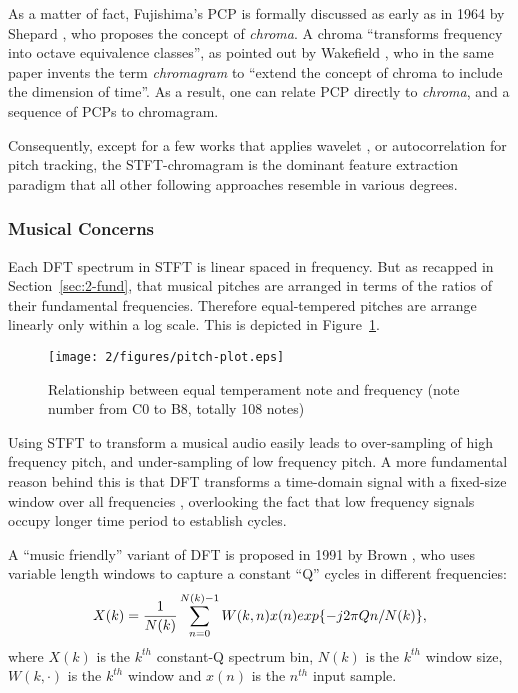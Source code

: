 As a matter of fact, Fujishima's PCP is formally discussed as early as in 1964 by Shepard \cite{shepard1964circularity}, who proposes the concept of {\it chroma}. A chroma ``transforms frequency into octave equivalence classes'', as pointed out by Wakefield \cite{wakefield1999mathematical}, who in the same paper invents the term {\it chromagram} to ``extend the concept of chroma to include the dimension of time''. As a result, one can relate PCP directly to {\it chroma}, and a sequence of PCPs to chromagram.

Consequently, except for a few works that applies wavelet \cite{su2001multi}, or autocorrelation \cite{bello2000techniques,zenz2007automatic} for pitch tracking, the STFT-chromagram is the dominant feature extraction paradigm that all other following approaches resemble in various degrees.

\subsubsection{Musical Concerns}
Each DFT spectrum in STFT is linear spaced in frequency. But as recapped in Section~\ref{sec:2-fund}, that musical pitches are arranged in terms of the ratios of their fundamental frequencies. Therefore equal-tempered pitches are arrange linearly only within a log scale. This is depicted in Figure~\ref{fig:2-pitchplot}.
\begin{figure}[htb]
\centering
\texttt{[image: 2/figures/pitch-plot.eps]}
\caption{Relationship between equal temperament note and frequency (note number from C0 to B8, totally 108 notes)}
\label{fig:2-pitchplot}
\end{figure}
Using STFT to transform a musical audio easily leads to over-sampling of high frequency pitch, and under-sampling of low frequency pitch. A more fundamental reason behind this is that DFT transforms a time-domain signal with a fixed-size window over all frequencies \cite{oppenheim1983signals}, overlooking the fact that low frequency signals occupy longer time period to establish cycles.

A ``music friendly'' variant of DFT is proposed in 1991 by Brown \cite{brown1991calculation}, who uses variable length windows to capture a constant ``Q'' cycles in different frequencies:
\begin{equation}
X(k) = {1\over {N(k)}} \sum_{n=0}^{N(k)-1}{W(k,n)x(n)exp\{-j2\pi Qn/N(k)\}},
\end{equation}
where $X(k)$ is the $k^{th}$ constant-Q spectrum bin, $N(k)$ is the $k^{th}$ window size, $W(k,\cdot)$ is the $k^{th}$ window and $x(n)$ is the $n^{th}$ input sample.


